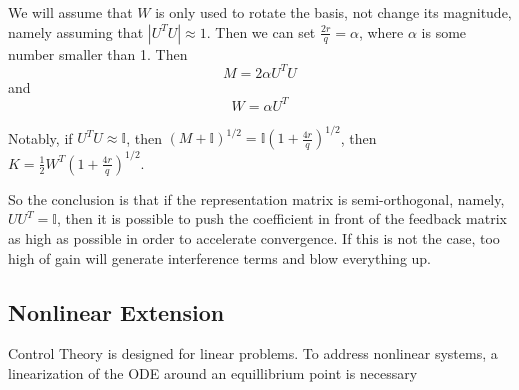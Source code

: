 \documentclass[11pt,a4paper]{article}
\begin{document}
We will assume that $W$ is only used to rotate the basis, not change its magnitude, namely assuming that $|U^TU| \approx 1$. Then we can set $\frac{2r}{q} = \alpha$, where $\alpha$ is some number smaller than 1. Then
$$M = 2 \alpha U^T U$$
and
$$W = \alpha U^T$$

Notably, if $U^TU \approx \mathbb{I}$, then $(M + \mathbb{I})^{1/2} = \mathbb{I}(1 + \frac{4r}{q})^{1/2}$, then $K = \frac{1}{2}W^T (1 + \frac{4r}{q})^{1/2}$.

So the conclusion is that if the representation matrix is semi-orthogonal, namely, $UU^T = \mathbb{I}$, then it is possible to push the coefficient in front of the feedback matrix as high as possible in order to accelerate convergence. If this is not the case, too high of gain will generate interference terms and blow everything up.

\subsection{Nonlinear Extension}

Control Theory is designed for linear problems. To address nonlinear systems, a linearization of the ODE around an equillibrium point is necessary
\end{document}
